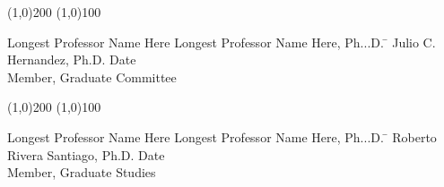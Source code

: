   \noindent
\line(1,0){200} \hspace{40 mm} \line(1,0){100}\\
  \noindent
\vspace{-1.75\baselineskip}
  \begin{tabbing}
Longest Professor Name Here Longest Professor Name Here, Ph...D.   \=  \kill 
Julio C. Hernandez, Ph.D. \>  Date\\Member, Graduate Committee %
\end{tabbing}


  \noindent
\line(1,0){200} \hspace{40 mm} \line(1,0){100}\\
  \noindent
\vspace{-1.75\baselineskip}
  \begin{tabbing}
Longest Professor Name Here Longest Professor Name Here, Ph...D.  \=  \kill 
Roberto Rivera Santiago, Ph.D. \>  Date\\Member, Graduate Studies  %
\end{tabbing}

